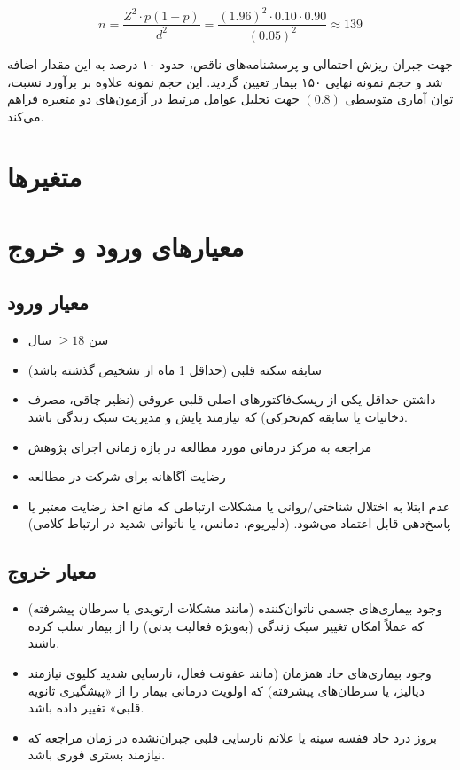 \[
n = \frac{Z^{2} \cdot p(1-p)}{d^{2}}
  = \frac{(1.96)^{2} \cdot 0.10 \cdot 0.90}{(0.05)^{2}}
  \approx 139
\]

جهت جبران ریزش احتمالی و پرسشنامه‌های ناقص، حدود ۱۰ درصد به این مقدار اضافه شد و حجم نمونه نهایی ۱۵۰ بیمار تعیین گردید. این حجم نمونه علاوه بر برآورد نسبت، توان آماری متوسطی $(0.8)$ جهت تحلیل عوامل مرتبط در آزمون‌های دو متغیره فراهم می‌کند.


\newpage
\section{متغیرها}


\section{معیارهای ورود و خروج}
\label{sec:eligibility}

\subsection*{معیار ورود}

\begin{itemize}
\item سن $\geq 18$ سال
\item سابقه سکته قلبی (حداقل 1 ماه از تشخیص گذشته باشد)
\item داشتن حداقل یکی از ریسک‌فاکتورهای اصلی قلبی-عروقی (نظیر چاقی، مصرف دخانیات یا سابقه کم‌تحرکی) که نیازمند پایش و مدیریت سبک زندگی باشد.
\item مراجعه به مرکز درمانی مورد مطالعه در بازه زمانی اجرای پژوهش
\item رضایت آگاهانه برای شرکت در مطالعه
\item عدم ابتلا به اختلال شناختی/روانی یا مشکلات ارتباطی که مانع اخذ رضایت معتبر یا پاسخ‌دهی قابل اعتماد می‌شود. (دلیریوم، دمانس، یا ناتوانی شدید در ارتباط کلامی)
\end{itemize}

\subsection*{معیار خروج}

\begin{itemize}
\item وجود بیماری‌های جسمی ناتوان‌کننده (مانند مشکلات ارتوپدی یا سرطان پیشرفته) که عملاً امکان تغییر سبک زندگی (به‌ویژه فعالیت بدنی) را از بیمار سلب کرده باشند.
\item وجود بیماری‌های حاد همزمان (مانند عفونت فعال، نارسایی شدید کلیوی نیازمند دیالیز، یا سرطان‌های پیشرفته) که اولویت درمانی بیمار را از «پیشگیری ثانویه قلبی» تغییر داده باشد.
\item بروز درد حاد قفسه سینه یا علائم نارسایی قلبی جبران‌نشده در زمان مراجعه که نیازمند بستری فوری باشد.
\end{itemize}


